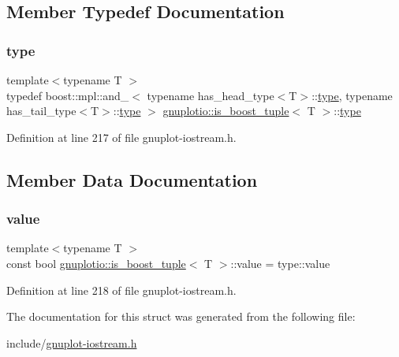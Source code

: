 \subsection{Member Typedef Documentation}
\mbox{\label{structgnuplotio_1_1is__boost__tuple_ad771f62833b23ecae5dc689e6248396a}} 
\subsubsection{\texorpdfstring{type}{type}}
{\footnotesize\ttfamily template$<$typename T $>$ \\
typedef boost\+::mpl\+::and\+\_\+$<$ typename has\+\_\+head\+\_\+type$<$T$>$\+::\hyperlink{structgnuplotio_1_1is__boost__tuple_ad771f62833b23ecae5dc689e6248396a}{type}, typename has\+\_\+tail\+\_\+type$<$T$>$\+::\hyperlink{structgnuplotio_1_1is__boost__tuple_ad771f62833b23ecae5dc689e6248396a}{type} $>$ \hyperlink{structgnuplotio_1_1is__boost__tuple}{gnuplotio\+::is\+\_\+boost\+\_\+tuple}$<$ T $>$\+::\hyperlink{structgnuplotio_1_1is__boost__tuple_ad771f62833b23ecae5dc689e6248396a}{type}}



Definition at line 217 of file gnuplot-\/iostream.\+h.



\subsection{Member Data Documentation}
\mbox{\label{structgnuplotio_1_1is__boost__tuple_ae6664b02421d28585204104af65a4744}} 
\subsubsection{\texorpdfstring{value}{value}}
{\footnotesize\ttfamily template$<$typename T $>$ \\
const bool \hyperlink{structgnuplotio_1_1is__boost__tuple}{gnuplotio\+::is\+\_\+boost\+\_\+tuple}$<$ T $>$\+::value = type\+::value\hspace{0.3cm}{\ttfamily [static]}}



Definition at line 218 of file gnuplot-\/iostream.\+h.



The documentation for this struct was generated from the following file\+:\begin{DoxyCompactItemize}
\item 
include/\hyperlink{gnuplot-iostream_8h}{gnuplot-\/iostream.\+h}\end{DoxyCompactItemize}

